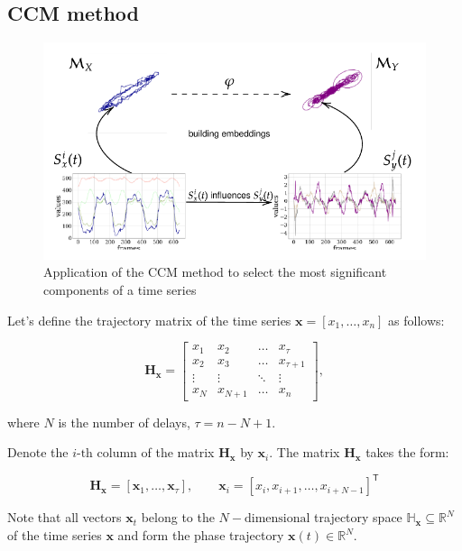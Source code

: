 \documentclass[bst/sn-mathphys]{sn-jnl}%
\newcommand{\bx}{\ensuremath{\mathbf{x}}}
\newcommand{\bH}{\mathbf{H}}
\newcommand{\dH}{\mathbb{H}}
\newcommand{\dR}{\mathbb{R}}
\renewcommand{\T}{^{\mathsf{T}}}
\theoremstyle{thmstyleone}%
\theoremstyle{thmstyletwo}%
\theoremstyle{thmstylethree}%
\begin{document}
\subsection{CCM method}
\begin{figure}[bhtp]
	\includegraphics[width=\textwidth]{block_scheme_4.pdf}
	\caption{Application of the CCM method to select the most significant components of a time series}
	\label{fig:schema}
\end{figure}

Let's define the trajectory matrix of the time series $\bx = [x_1, \ldots, x_n]$ as follows:

\begin{equation*} \label{eq:traj_mat}
	\bH_{\bx} = \begin{bmatrix}
		x_1 & x_2 & \ldots & x_{\tau} \\
		x_2 & x_3 & \ldots & x_{\tau+1} \\
		\vdots & \vdots & \ddots & \vdots \\
		x_{N} & x_{N+1} & \ldots & x_n
	\end{bmatrix}, 
\end{equation*} 

where $N$ is the number of delays, $\tau = n - N + 1$.

Denote the $i\text{-th}$ column of the matrix $\bH_{\bx}$ by $\bx_i$.
The matrix $\bH_{\bx}$ takes the form:

\begin{equation*}\label{eq:traj_mat_short}
	\bH_{\bx} = [\bx_1, \ldots, \bx_{\tau}], \qquad \bx_i = [x_i, x_{i+1}, \ldots, x_{i+N-1}] \T
\end{equation*}

Note that all vectors $\bx_t$ belong to the $N-\text{dimensional}$ trajectory space $\dH_{\bx} \subseteq \dR^N$ of the time series $\bx$ and form the phase trajectory $\bx(t) \in \dR^N$.
\end{document}
